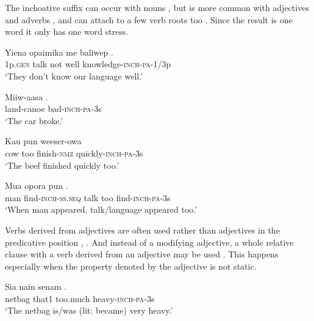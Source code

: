 The inchoative suffix \textstyleEmphasizedVernacularWords{\nobreakdash-} can occur with nouns , but is more common with adjectives  and adverbs , and can attach to a few verb roots too . Since the result is one word it only has one word stress. 

\ea%
\label{ex:3:x193}
\gll Yiena opaimika me baliwep . \\
1p.\textsc{gen} talk not well knowledge-\textsc{inch}-\textsc{pa}-1/3p \\
\glt`They don't know our language well.'
\z

\ea%
\label{ex:3:x194}
\gll Miiw-aasa .{\upshape\footnotemark} \\
land-canoe bad-\textsc{inch}-\textsc{pa}-3s \\
\glt`The car broke.'
\z


\ea%
\label{ex:3:x195}
\gll Kau pun weeser-owa  \\
cow too finish-\textsc{nmz} quickly-\textsc{inch}-\textsc{pa}-3s \\
\glt`The beef finished quickly too.'
\z

\ea%
\label{ex:3:x196}
\gll Mua  opora pun . \\
man find-\textsc{inch}-\textsc{ss}.\textsc{seq} talk too find-\textsc{inch}-\textsc{pa}-3s\\
\glt`When man appeared, talk/language appeared too.'
\z

Verbs derived from adjectives are often used rather than adjectives in the predicative position , . And instead of a modifying adjective, a whole relative clause with a verb derived from an adjective may be used . This happens especially when the property denoted by the adjective is not static. 

\ea%
\label{ex:3:x82}
\gll Sia nain senam . \\
netbag that1 too.much heavy-\textsc{inch}-\textsc{pa}-3s\\
\glt`The netbag is/was (lit: became) very heavy.' 
\z

